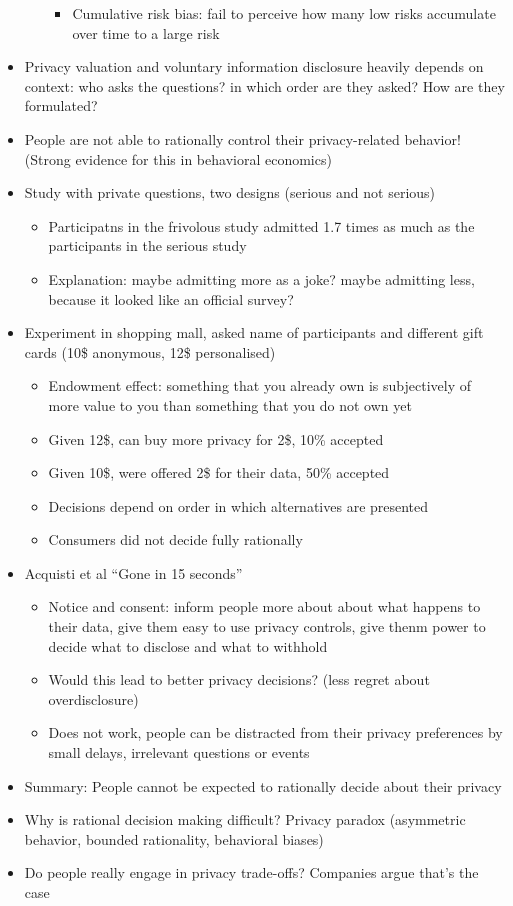 \documentclass[a4paper,12pt]{scrartcl}
\begin{document}
\begin{itemize}
\begin{itemize}
\begin{itemize}
					\item
						Cumulative risk bias: fail to perceive how many low risks accumulate over time to a large risk
				\end{itemize}
		\end{itemize}
	\item
		Privacy valuation and voluntary information disclosure heavily depends on context: who asks the questions? in which order are they asked? How are they formulated?
	\item
		People are not able to rationally control their privacy-related behavior! (Strong evidence for this in behavioral economics)
	\item
		Study with private questions, two designs (serious and not serious)
		\begin{itemize}
			\item
				Participatns in the frivolous study admitted 1.7 times as much as the participants in the serious study
			\item
				Explanation: maybe admitting more as a joke? maybe admitting less, because it looked like an official survey?
		\end{itemize}
	\item
		Experiment in shopping mall, asked name of participants and different gift cards (10\$ anonymous, 12\$ personalised)
		\begin{itemize}
			\item
				Endowment effect: something that you already own is subjectively of more value to you than something that you do not own yet
			\item
				Given 12\$, can buy more privacy for 2\$, 10\% accepted
			\item
				Given 10\$, were offered 2\$ for their data, 50\% accepted
			\item
				Decisions depend on order in which alternatives are presented
			\item
				Consumers did not  decide fully rationally
		\end{itemize}
	\item
		Acquisti et al \enquote{Gone in 15 seconds}
		\begin{itemize}
			\item
				Notice and consent: inform people more about about what happens to their data, give them easy to use privacy controls, give thenm power to decide what to disclose and what to withhold
			\item
				Would this lead to better privacy decisions? (less regret about overdisclosure)
			\item
				Does not work, people can be distracted from their privacy preferences by small delays, irrelevant questions or events
		\end{itemize}
	\item
		Summary: People cannot be expected to rationally decide about their privacy
	\item
		Why is rational decision making difficult? Privacy paradox (asymmetric behavior, bounded rationality, behavioral biases)
	\item
		Do people really engage in privacy trade-offs? Companies argue that's the case


\end{itemize}
\end{document}
